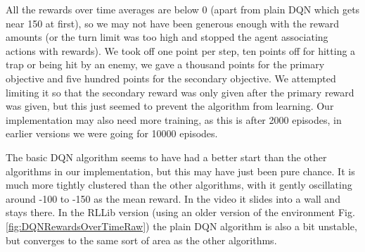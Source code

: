 \documentclass[a4pape, 11pt, english]{article}
\begin{document}

All the rewards over time averages are below 0 (apart from plain DQN which gets near 150 at first), so we may not have been generous enough with the reward amounts (or the turn limit was too high and stopped the agent associating actions with rewards). We took off one point per step, ten points off for hitting a trap or being hit by an enemy, we gave a thousand points for the primary objective and five hundred points for the secondary objective. We attempted limiting it so that the secondary reward was only given after the primary reward was given, but this just seemed to prevent the algorithm from learning. Our implementation may also need more training, as this is after 2000 episodes, in earlier versions we were going for 10000 episodes.

The basic DQN algorithm seems to have had a better start than the other algorithms in our implementation, but this may have just been pure chance. It is much more tightly clustered than the other algorithms, with it gently oscillating around -100 to -150 as the mean reward. In the video it slides into a wall and stays there. In the RLLib version (using an older version of the environment Fig. \ref{fig:DQNRewardsOverTimeRaw}) the plain DQN algorithm is also a bit unstable, but converges to the same sort of area as the other algorithms.
\end{document}

